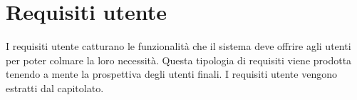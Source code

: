 \section{Requisiti utente}
\label{sec:requisiti_utente}
I requisiti utente catturano le funzionalità che il sistema deve offrire agli utenti per poter colmare la loro necessità.
Questa tipologia di requisiti viene prodotta tenendo a mente la prospettiva degli utenti finali.
I requisiti utente vengono estratti dal capitolato.

